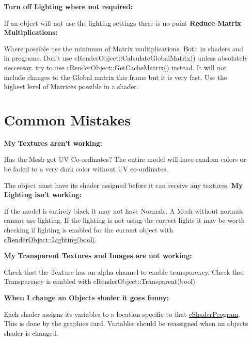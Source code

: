  {\bfseries Turn off Lighting where not required:} \par
 If an object will not use the lighting settings there is no point {\bfseries Reduce Matrix Multiplications:} \par
 Where possible use the minimum of Matrix multiplications. Both in shaders and in programs. Don't use cRenderObject::CalculateGlobalMatrix() unless absolutely neccessay. try to use cRenderObject::GetCacheMatrix() instead. It will not include changes to the Global matrix this frame but it is very fast. Use the highest level of Matrices possible in a shader.\hypertarget{_reference_lists_CommonMistakes}{}\section{Common Mistakes}\label{_reference_lists_CommonMistakes}
{\bfseries  My Textures aren't working: } \par
 Has the Mesh got UV Co-\/ordinates? The entire model will have random colors or be faded to a very dark color without UV co-\/ordinates. \par
 The object must have its shader assigned before it can receive any textures. {\bfseries  My Lighting isn't working: } \par
 If the model is entirely black it may not have Normals. A Mesh without normals cannot use lighting. If the lighting is not using the correct lights it may be worth checking if lighting is enabled for the current object with \hyperlink{classc_render_object_a67191d0fe8aceaa10052a542b3c34650}{cRenderObject::Lighting(bool)}. \par
 {\bfseries  My Transparent Textures and Images are not working:} \par
 Check that the Texture has an alpha channel to enable transparency. Check that Transparency is enabled with cRenderObject::Transparent(bool) \par
 {\bfseries When I change an Objects shader it goes funny:} \par
 Each shader assigns its variables to a location specific to that \hyperlink{classc_shader_program}{cShaderProgram}. This is done by the graphics card. Variables should be reassigned when an objects shader is changed. 